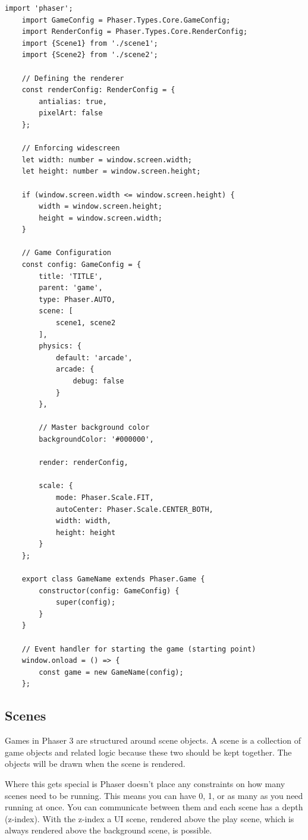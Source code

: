 \begin{lstlisting}[style=TypeScript, caption={Game Setup File}, label={lst:gamesetupfile}]
    import 'phaser';
    import GameConfig = Phaser.Types.Core.GameConfig;
    import RenderConfig = Phaser.Types.Core.RenderConfig;
    import {Scene1} from './scene1';
    import {Scene2} from './scene2';

    // Defining the renderer
    const renderConfig: RenderConfig = {
        antialias: true,
        pixelArt: false
    };

    // Enforcing widescreen
    let width: number = window.screen.width;
    let height: number = window.screen.height;

    if (window.screen.width <= window.screen.height) {
        width = window.screen.height;
        height = window.screen.width;
    }

    // Game Configuration
    const config: GameConfig = {
        title: 'TITLE',
        parent: 'game',
        type: Phaser.AUTO,
        scene: [
            scene1, scene2
        ],
        physics: {
            default: 'arcade',
            arcade: {
                debug: false
            }
        },

        // Master background color
        backgroundColor: '#000000',

        render: renderConfig,

        scale: {
            mode: Phaser.Scale.FIT,
            autoCenter: Phaser.Scale.CENTER_BOTH,
            width: width,
            height: height
        }
    };

    export class GameName extends Phaser.Game {
        constructor(config: GameConfig) {
            super(config);
        }
    }

    // Event handler for starting the game (starting point)
    window.onload = () => {
        const game = new GameName(config);
    };
\end{lstlisting}

\subsection{Scenes}\label{subsec:scenes}
Games in Phaser 3 are structured around scene objects.
A scene is a collection of game objects and related logic because these two should be kept together.
The objects will be drawn when the scene is rendered.

Where this gets special is Phaser doesn't place any constraints on how many scenes need to be running.
This means you can have 0, 1, or as many as you need running at once.
You can communicate between them and each scene has a depth (z-index).
With the z-index a UI scene, rendered above the play scene, which is always rendered above the background scene, is possible.

